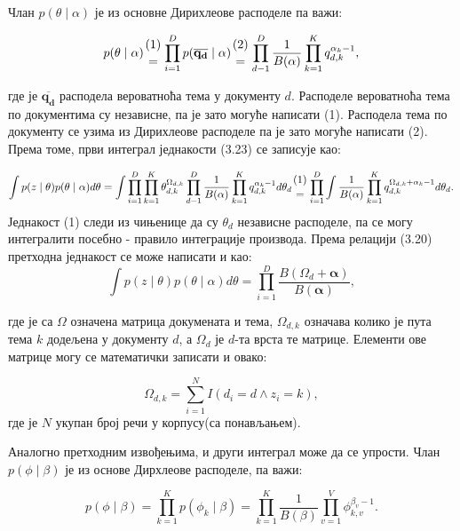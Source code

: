 Члан $p(\theta \mid \alpha)$ је из основне Дирихлеове расподеле па важи:

\begin{equation}
	p(\theta \mid \alpha)  {(1) \atop = }\prod_{i=1}^D p(\mathbf{\overline{q_d}} \mid \alpha) {(2) \atop = }
	 \prod_{d-1}^D \frac{1}{B(\alpha)}\prod_{k=1}^K q_{d,k}^{\alpha_k -1},
\end{equation}


где је $\mathbf{\overline{q_d}}$ расподела вероватноћа тема у документу $d$. Расподеле вероватноћа тема по документима су независне, па је зато могуће написати (1). Расподела тема по документу се узима из Дирихлеове расподеле па је зато могуће написати (2). Према томе, први интеграл једнакости (3.23) се записује као:

\begin{equation}
	 \int p(z \mid \theta)p(\theta \mid \alpha)d\theta = \int \prod_{i=1}^D \prod_{k=1}^K \theta_{d,k}^{\Omega_{d,k}} \prod_{d-1}^D \frac{1}{B(\alpha)}\prod_{k=1}^K q_{d,k}^{\alpha_k -1}d\theta_d {(1) \atop = } \prod_{i=1}^D \int \frac{1}{B(\alpha)}\prod_{k=1}^K q_{d,k}^{\Omega_{d,k} +\alpha_k -1}d\theta_d.
\end{equation}
Једнакост (1) следи из чињенице да су $\theta_d$ независне расподеле, па се могу интегралити посебно - правило интеграције производа. Према релацији (3.20) претходна једнакост се може написати и као:
\begin{equation}
 \int p(z \mid \theta)p(\theta \mid \alpha)d\theta = \prod_{i=1}^D \frac{B(\Omega_d+\mathbf{\alpha})}{B(\mathbf{\alpha})},
\end{equation}

где је са $\Omega$ означена матрица докумената и тема, $\Omega_{d,k}$ означава колико је пута тема $k$ додељена у документу $d$, а $\Omega_d$ је $d$-та врста те матрице. Елементи ове матрице могу се математички записати и овако:

\begin{equation}
\Omega_{d,k} = \sum_{i=1}^N I(d_i=d \wedge z_i=k),
\end{equation}
где је $N$ укупан број речи у корпусу(са понављањем).

Аналогно претходним извођењима, и други интеграл може да се упрости. Члан $p(\phi \mid \beta)$ је из основе Дирхлеове расподеле, па важи:

\begin{equation}
p(\phi \mid \beta) = \prod_{k=1}^K p(\phi_k \mid \beta) = \prod_{k=1}^K \frac{1}{B(\beta)}\prod_{v=1}^V \phi_{k,v}^{\beta_v-1}.
\end{equation}

